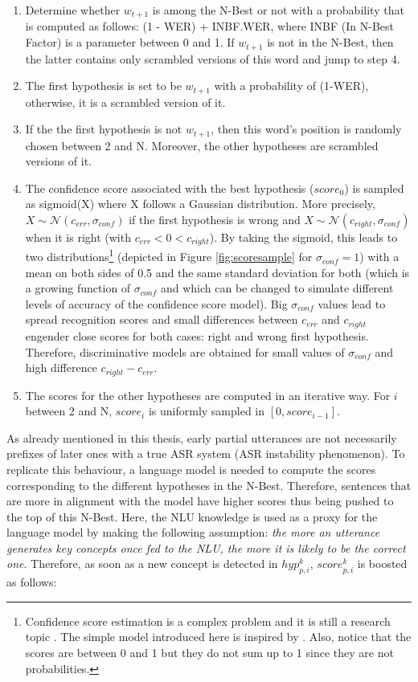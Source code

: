 					\begin{enumerate}
						\item Determine whether $w_{t+1}$ is among the N-Best or not with a probability that is computed as follows: (1 - WER) + INBF.WER, where INBF (In N-Best Factor) is a parameter between 0 and 1. If $w_{t+1}$ is not in the N-Best, then the latter contains only scrambled versions of this word and jump to step 4.
							\item The first hypothesis is set to be $w_{t+1}$ with a probability of (1-WER), otherwise, it is a scrambled version of it.
							\item If the the first hypothesis is not $w_{t+1}$, then this word's position is randomly chosen between 2 and N. Moreover, the other hypotheses are scrambled versions of it.
							\item The confidence score associated with the best hypothesis ($score_0$) is sampled as sigmoid(X) where X follows a Gaussian distribution. More precisely,\\$X \sim \mathcal{N} (c_{err},\sigma_{conf})$ if the first hypothesis is wrong and $X \sim \mathcal{N} (c_{right},\sigma_{conf})$ when it is right (with $c_{err} < 0 < c_{right}$). By taking the sigmoid, this leads to two distributions\footnote{Confidence score estimation is a complex problem and it is still a research topic \cite{Jiang2005,Seigel2011}. The simple model introduced here is inspired by \cite{Pietquin2005}. Also, notice that the scores are between 0 and 1 but they do not sum up to 1 since they are not probabilities.} (depicted in Figure \ref{fig:scoresample} for $\sigma_{conf} = 1$) with a mean on both sides of 0.5 and the same standard deviation for both (which is a growing function of $\sigma_{conf}$ and which can be changed to simulate different levels of accuracy of the confidence score model). Big $\sigma_{conf}$ values lead to spread recognition scores and small differences between $c_{err}$ and $c_{right}$ engender close scores for both cases: right and wrong first hypothesis. Therefore, discriminative models are obtained for small values of $\sigma_{conf}$ and high difference $c_{right}-c_{err}$.
							\item The scores for the other hypotheses are computed in an iterative way. For $i$ between 2 and N, $score_i$ is uniformly sampled in $[0,score_{i-1}]$.
					\end{enumerate}
					
					As already mentioned in this thesis, early partial utterances are not necessarily prefixes of later ones with a true ASR system (ASR instability phenomenon). To replicate this behaviour, a language model is needed to compute the scores corresponding to the different hypotheses in the N-Best. Therefore, sentences that are more in alignment with the model have higher scores thus being pushed to the top of this N-Best. Here, the NLU knowledge is used as a proxy for the language model by making the following assumption: \textit{the more an utterance generates key concepts once fed to the NLU, the more it is likely to be the correct one}. Therefore, as soon as a new concept is detected in $hyp^k_{p,i}$, $score^k_{p,i}$ is boosted as follows:
					
